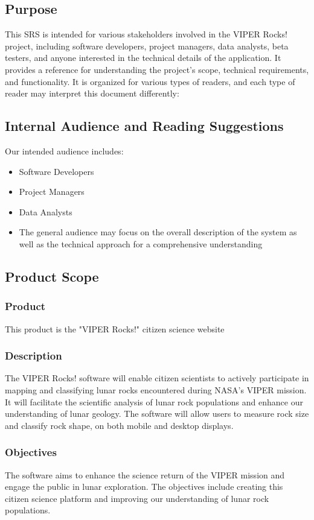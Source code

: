 \documentclass{article}
\begin{document}
\subsection{Purpose}
This SRS is intended for various stakeholders involved in the VIPER Rocks! project, including software developers, project managers, data analysts, beta testers, and anyone interested in the technical details of the application. It provides a reference for understanding the project's scope, technical requirements, and functionality. It is organized for various types of readers, and each type of reader may interpret this document differently:

\subsection{Internal Audience and Reading Suggestions}
Our intended audience includes: 
\begin{itemize}
	\item Software Developers
	\item Project Managers
	\item Data Analysts
	\item The general audience may focus on the overall description of the system as well as the technical approach for a comprehensive understanding
\end{itemize}

\subsection{Product Scope}

\subsubsection{Product}
This product is the "VIPER Rocks!" citizen science website

\subsubsection{Description}
The VIPER Rocks! software will enable citizen scientists to actively participate in mapping and classifying lunar rocks encountered during NASA's VIPER mission. It will facilitate the scientific analysis of lunar rock populations and enhance our understanding of lunar geology. The software will allow users to measure rock size and classify rock shape, on both mobile and desktop displays.

\subsubsection{Objectives}
The software aims to enhance the science return of the VIPER mission and engage the public in lunar exploration. The objectives include creating this citizen science platform and improving our understanding of lunar rock populations.
\end{document}

